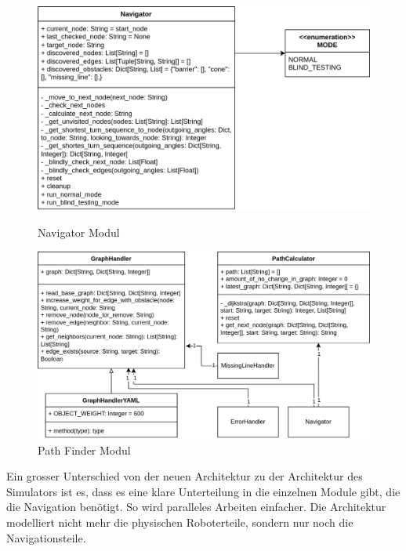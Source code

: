 \begin{figure}[H]
  \centering
    \begin{minipage}[b]{0.48\textwidth}
    \centering
    \includegraphics[width=\textwidth]{assets/IT/robot-sw-architecture-navigator.png}
    \caption{Navigator Modul}
    \label{fig:nav-navigator}
  \end{minipage}
  \hfill
  \begin{minipage}[b]{0.48\textwidth}
    \centering
    \includegraphics[width=\textwidth]{assets/IT/robot-sw-architecture-path_finder.png}
    \caption{Path Finder Modul}
    \label{fig:nav-pathfinder}
  \end{minipage}
\end{figure}

Ein grosser Unterschied von der neuen Architektur zu der Architektur des Simulators ist es, dass es eine klare Unterteilung in die einzelnen Module gibt, die die Navigation benötigt. So wird paralleles Arbeiten einfacher. Die Architektur modelliert nicht mehr die physischen Roboterteile, sondern nur noch die Navigationsteile.

